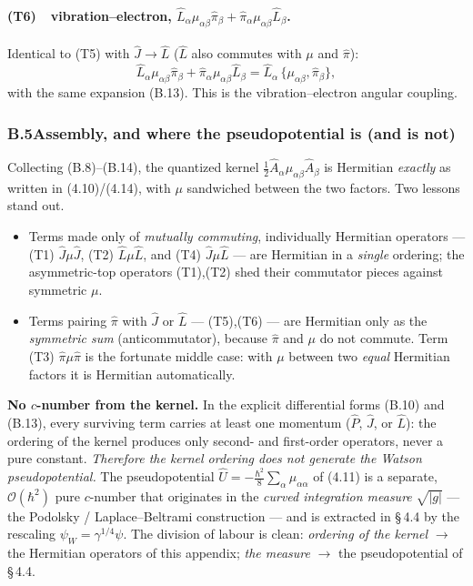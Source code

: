 \paragraph{(T6)\ \ vibration--electron, $\hat L_\alpha\mu_{\alpha\beta}\hat\pi_\beta+\hat\pi_\alpha\mu_{\alpha\beta}\hat L_\beta$.}
Identical to (T5) with $\hat J\to\hat L$ ($\hat L$ also commutes with $\mu$ and $\hat\pi$):
\begin{equation}
\hat L_\alpha\mu_{\alpha\beta}\hat\pi_\beta+\hat\pi_\alpha\mu_{\alpha\beta}\hat L_\beta
=\hat L_\alpha\,\{\mu_{\alpha\beta},\hat\pi_\beta\}, \tag{B.14}
\end{equation}
with the same expansion (B.13). This is the vibration--electron angular coupling.

\subsubsection*{B.5\quad Assembly, and where the pseudopotential is (and is not)}

Collecting (B.8)--(B.14), the quantized kernel $\tfrac12\hat A_\alpha\mu_{\alpha\beta}\hat A_\beta$ is Hermitian \emph{exactly} as written in (4.10)/(4.14), with $\mu$ sandwiched between the two factors. Two lessons stand out.
\begin{itemize}
\item Terms made only of \emph{mutually commuting}, individually Hermitian operators --- (T1) $\hat J\mu\hat J$, (T2) $\hat L\mu\hat L$, and (T4) $\hat J\mu\hat L$ --- are Hermitian in a \emph{single} ordering; the asymmetric-top operators (T1),(T2) shed their commutator pieces against symmetric $\mu$.
\item Terms pairing $\hat\pi$ with $\hat J$ or $\hat L$ --- (T5),(T6) --- are Hermitian only as the \emph{symmetric sum} (anticommutator), because $\hat\pi$ and $\mu$ do not commute. Term (T3) $\hat\pi\mu\hat\pi$ is the fortunate middle case: with $\mu$ between two \emph{equal} Hermitian factors it is Hermitian automatically.
\end{itemize}
\textbf{No $c$-number from the kernel.} In the explicit differential forms (B.10) and (B.13), every surviving term carries at least one momentum ($\hat P$, $\hat J$, or $\hat L$): the ordering of the kernel produces only second- and first-order operators, never a pure constant. \emph{Therefore the kernel ordering does not generate the Watson pseudopotential.} The pseudopotential $\hat U=-\tfrac{\hbar^2}{8}\sum_\alpha\mu_{\alpha\alpha}$ of (4.11) is a separate, $\mathcal O(\hbar^2)$ pure $c$-number that originates in the \emph{curved integration measure} $\sqrt{|g|}$ --- the Podolsky / Laplace--Beltrami construction --- and is extracted in \S\,4.4 by the rescaling $\psi_W=\gamma^{1/4}\psi$. The division of labour is clean: \emph{ordering of the kernel} $\rightarrow$ the Hermitian operators of this appendix; \emph{the measure} $\rightarrow$ the pseudopotential of \S\,4.4.
